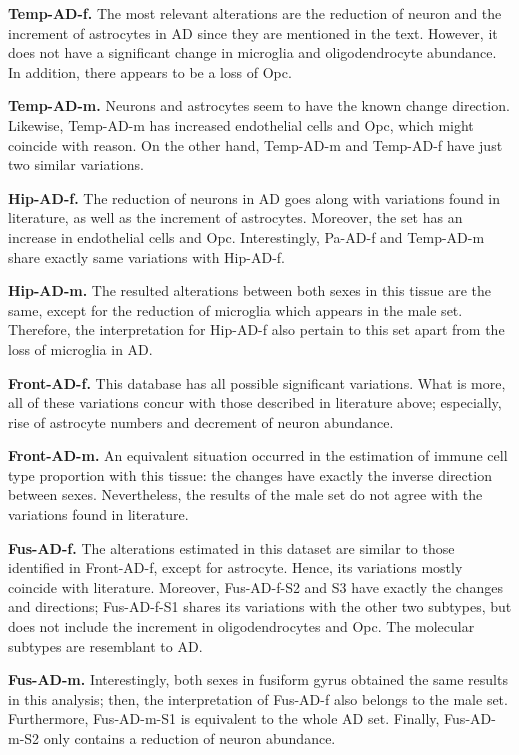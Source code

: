 \textbf{Temp-AD-f.} The most relevant alterations are the reduction of neuron and the increment of astrocytes in AD since they are mentioned in the text. However, it does not have a significant change in microglia and oligodendrocyte abundance. In addition, there appears to be a loss of Opc.

\textbf{Temp-AD-m.} Neurons and astrocytes seem to have the known change direction. Likewise, Temp-AD-m has increased endothelial cells and Opc, which might coincide with reason. On the other hand, Temp-AD-m and Temp-AD-f have just two similar variations.

\textbf{Hip-AD-f.} The reduction of neurons in AD goes along with variations found in literature, as well as the increment of astrocytes. Moreover, the set has an increase in endothelial cells and Opc. Interestingly, Pa-AD-f and Temp-AD-m share exactly same variations with Hip-AD-f.

\textbf{Hip-AD-m.} The resulted alterations between both sexes in this tissue are the same, except for the reduction of microglia which appears in the male set. Therefore, the interpretation for Hip-AD-f also pertain to this set apart from the loss of microglia in AD.

\textbf{Front-AD-f.} This database has all possible significant variations. What is more, all of these variations concur with those described in literature above; especially, rise of astrocyte numbers and decrement of neuron abundance.

\textbf{Front-AD-m.} An equivalent situation occurred in the estimation of immune cell type proportion with this tissue: the changes have exactly the inverse direction between sexes. Nevertheless, the results of the male set do not agree with the variations found in literature.

\textbf{Fus-AD-f.} The alterations estimated in this dataset are similar to those identified in Front-AD-f, except for astrocyte. Hence, its variations mostly coincide with literature. Moreover, Fus-AD-f-S2 and S3 have exactly the changes and directions; Fus-AD-f-S1 shares its variations with the other two subtypes, but does not include the increment in oligodendrocytes and Opc. The molecular subtypes are resemblant to AD.

\textbf{Fus-AD-m.} Interestingly, both sexes in fusiform gyrus obtained the same results in this analysis; then, the interpretation of Fus-AD-f also belongs to the male set. Furthermore, Fus-AD-m-S1 is equivalent to the whole AD set. Finally, Fus-AD-m-S2 only contains a reduction of neuron abundance.

